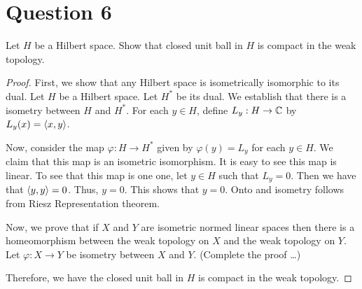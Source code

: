 \section{Question 6}
\horz

Let $H$ be a Hilbert space. Show that closed unit ball in $H$ is compact in the weak topology.

\horz

\begin{proof}
    First, we show that any Hilbert space is isometrically isomorphic to its dual. Let $H$ be a Hilbert space. Let $H^{*}$ be its dual. We establish that there is a isometry between $H$ and $H^{*}$. For each $y\in H$, define $L_{y} : H \to \mathbb C$ by $L_{y} (x) = \left\langle x,y \right\rangle$.

    Now, consider the map $\varphi : H \to H^{*}$ given by $\varphi \left( y \right) = L_{y}$ for each $y\in H$. We claim that this map is an isometric isomorphism. It is easy to see this map is linear. To see that this map is one one, let $y \in H$ such that $L_{y} = 0$. Then we have that $\left\langle y,y \right\rangle =0$. Thus, $y=0$. This shows that $y =0$. Onto and isometry follows from Riesz Representation theorem.

    Now, we prove that if $X$ and $Y$ are isometric normed linear spaces then there is a homeomorphism between the weak topology on $X$ and the weak topology on $Y$. Let $\varphi : X \to Y$ be isometry between $X$ and $Y$. (Complete the proof \ldots)

    Therefore, we have the closed unit ball in $H$ is compact in the weak topology.
\end{proof}
